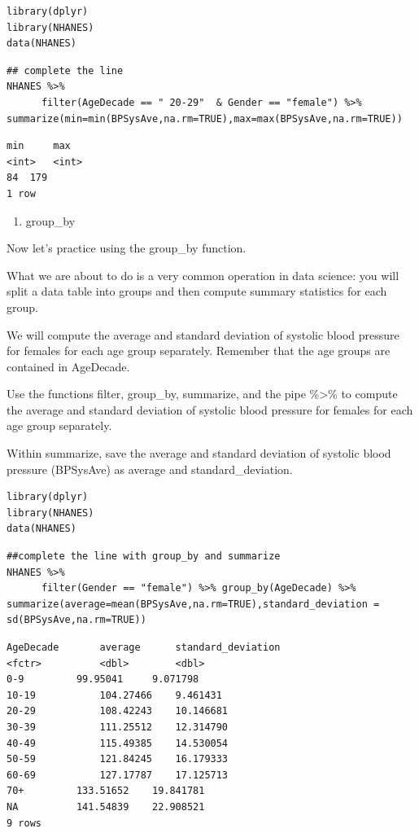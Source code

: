 \documentclass[
]{article}
\providecommand{\tightlist}{%
  \setlength{\itemsep}{0pt}\setlength{\parskip}{0pt}}
\begin{document}
\begin{verbatim}
library(dplyr)
library(NHANES)
data(NHANES)
\end{verbatim}

\begin{verbatim}
## complete the line
NHANES %>%
      filter(AgeDecade == " 20-29"  & Gender == "female") %>% summarize(min=min(BPSysAve,na.rm=TRUE),max=max(BPSysAve,na.rm=TRUE))
\end{verbatim}

\begin{verbatim}
min     max
<int>   <int>
84  179
1 row
\end{verbatim}

\begin{enumerate}
\def\labelenumi{\arabic{enumi}.}
\setcounter{enumi}{4}
\tightlist
\item
  group\_by
\end{enumerate}

Now let's practice using the group\_by function.

What we are about to do is a very common operation in data science: you
will split a data table into groups and then compute summary statistics
for each group.

We will compute the average and standard deviation of systolic blood
pressure for females for each age group separately. Remember that the
age groups are contained in AgeDecade.

Use the functions filter, group\_by, summarize, and the pipe
\%\textgreater\% to compute the average and standard deviation of
systolic blood pressure for females for each age group separately.

Within summarize, save the average and standard deviation of systolic
blood pressure (BPSysAve) as average and standard\_deviation.

\begin{verbatim}
library(dplyr)
library(NHANES)
data(NHANES)
\end{verbatim}

\begin{verbatim}
##complete the line with group_by and summarize
NHANES %>%
      filter(Gender == "female") %>% group_by(AgeDecade) %>% summarize(average=mean(BPSysAve,na.rm=TRUE),standard_deviation = sd(BPSysAve,na.rm=TRUE))
\end{verbatim}

\begin{verbatim}
AgeDecade       average      standard_deviation
<fctr>          <dbl>        <dbl>
0-9         99.95041     9.071798
10-19           104.27466    9.461431
20-29           108.42243    10.146681
30-39           111.25512    12.314790
40-49           115.49385    14.530054
50-59           121.84245    16.179333
60-69           127.17787    17.125713
70+         133.51652    19.841781
NA          141.54839    22.908521
9 rows
\end{verbatim}
\end{document}
